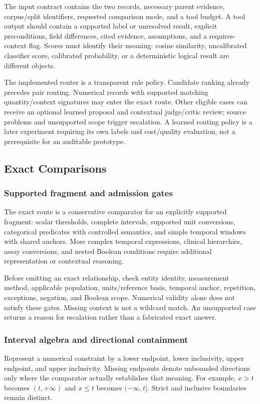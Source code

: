\documentclass[10pt,letterpaper]{article}
\begin{document}
The input contract contains the two records, necessary parent evidence,
corpus/split identifiers, requested comparison mode, and a tool budget. A
tool output should contain a supported label or unresolved result, explicit
preconditions, field differences, cited evidence, assumptions, and a
requires-context flag. Scores must identify their meaning: cosine similarity,
uncalibrated classifier score, calibrated probability, or a deterministic
logical result are different objects.

The implemented router is a transparent rule policy. Candidate ranking
already precedes pair routing. Numerical records with supported matching
quantity/context signatures may enter the exact route. Other eligible cases
can receive an optional learned proposal and contextual judge/critic review;
source problems and unsupported scope trigger escalation.
A learned routing policy is a later experiment requiring its own labels and
cost/quality evaluation, not a prerequisite for an auditable prototype.

\subsection{Exact Comparisons}
\label{sec:exact}

\subsubsection{Supported fragment and admission gates}
The exact route is a conservative comparator for an explicitly supported
fragment: scalar thresholds, complete intervals, supported unit conversions,
categorical predicates with controlled semantics, and simple temporal windows
with shared anchors. More complex temporal expressions, clinical
hierarchies, assay conversions, and nested Boolean conditions require
additional representation or contextual reasoning.

Before emitting an exact relationship, check entity identity, measurement
method, applicable population, units/reference basis, temporal anchor,
repetition, exceptions, negation, and Boolean scope. Numerical validity alone
does not satisfy these gates. Missing context is not a wildcard match.
An unsupported case returns a reason for escalation rather than a fabricated
exact answer.

\subsubsection{Interval algebra and directional containment}
Represent a numerical constraint by a lower endpoint, lower inclusivity,
upper endpoint, and upper inclusivity. Missing endpoints denote unbounded
directions only where the comparator actually establishes that meaning.
For example, $x>t$ becomes $(t,+\infty)$ and $x\leq t$ becomes
$(-\infty,t]$. Strict and inclusive boundaries remain distinct.
\end{document}
